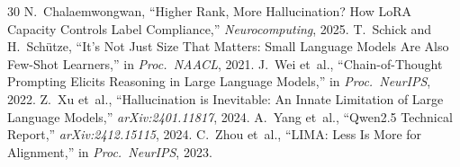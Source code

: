 \documentclass[review,3p]{elsarticle}
\begin{document}
\begin{thebibliography}{30}
 N.~Chalaemwongwan, ``Higher Rank, More Hallucination? How LoRA Capacity Controls Label Compliance,'' \emph{Neurocomputing}, 2025.
 T.~Schick and H.~Sch\"{u}tze, ``It's Not Just Size That Matters: Small Language Models Are Also Few-Shot Learners,'' in \emph{Proc.\ NAACL}, 2021.
 J.~Wei et~al., ``Chain-of-Thought Prompting Elicits Reasoning in Large Language Models,'' in \emph{Proc.\ NeurIPS}, 2022.
 Z.~Xu et~al., ``Hallucination is Inevitable: An Innate Limitation of Large Language Models,'' \emph{arXiv:2401.11817}, 2024.
 A.~Yang et~al., ``Qwen2.5 Technical Report,'' \emph{arXiv:2412.15115}, 2024.
 C.~Zhou et~al., ``LIMA: Less Is More for Alignment,'' in \emph{Proc.\ NeurIPS}, 2023.
\end{thebibliography}
\end{document}
